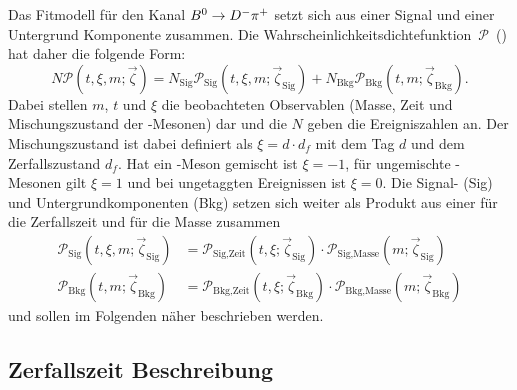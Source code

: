 Das Fitmodell für den Kanal ${{B}^0}\rightarrow{\ensuremath{{D}^-}}{\ensuremath{{\pi}^+}}$ setzt sich aus einer Signal und einer Untergrund Komponente zusammen. Die \mbox{Wahrscheinlichkeitsdichtefunktion $\mathcal{P}$ (\PDF)} hat daher die folgende Form:
\begin{equation}
N\mathcal{P}(t,\xi,m;\vec{\zeta})=N_\text{Sig}\mathcal{P}_\text{Sig}(t,\xi,m;\vec{\zeta}_\text{Sig})+N_\text{Bkg}\mathcal{P}_\text{Bkg}(t,m;\vec{\zeta}_\text{Bkg}).
\end{equation}
Dabei stellen $m$, $t$ und $\xi$ die beobachteten Observablen (Masse, Zeit und Mischungszustand der \Bz-Mesonen) dar und die $N$ geben die Ereigniszahlen an. Der Mischungszustand ist dabei definiert als $\xi=d\cdot d_f$ mit dem Tag $d$ und dem Zerfallszustand $d_f$. Hat ein \Bz-Meson gemischt ist $\xi=-1$, für ungemischte \Bz-Mesonen gilt $\xi=1$ und bei ungetaggten Ereignissen ist $\xi=0$. Die Signal- (Sig) und Untergrundkomponenten (Bkg) setzen sich weiter als Produkt aus einer \PDF für die Zerfallszeit und für die Masse zusammen
\begin{equation}
\begin{split}
\mathcal{P}_\text{Sig}(t,\xi,m;\vec{\zeta}_\text{Sig})&=\mathcal{P}_\text{Sig,Zeit}(t,\xi;\vec{\zeta}_\text{Sig})\cdot\mathcal{P}_\text{Sig,Masse}(m;\vec{\zeta}_\text{Sig})\\
\mathcal{P}_\text{Bkg}(t,m;\vec{\zeta}_\text{Bkg})&=\mathcal{P}_\text{Bkg,Zeit}(t,\xi;\vec{\zeta}_\text{Bkg})\cdot\mathcal{P}_\text{Bkg,Masse}(m;\vec{\zeta}_\text{Bkg})
\end{split}
\end{equation}
und sollen im Folgenden näher beschrieben werden.

\subsection{Zerfallszeit Beschreibung}


